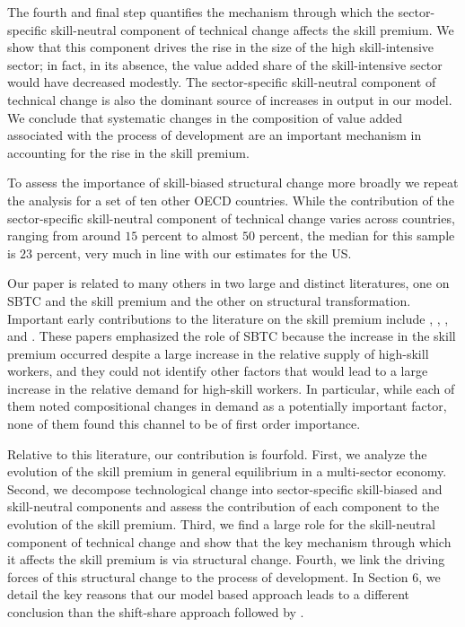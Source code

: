 \documentclass[12pt,english]{article}
\begin{document}
The fourth and final step quantifies the mechanism through which the
sector-specific skill-neutral component of technical change affects the
skill premium. We show that this component drives the rise in the size of
the high skill-intensive sector; in fact, in its absence, the value added
share of the skill-intensive sector would have decreased modestly. The
sector-specific skill-neutral component of technical change is also the
dominant source of increases in output in our model. We conclude that
systematic changes in the composition of value added associated with the
process of development are an important mechanism in accounting for the rise
in the skill premium.

To assess the importance of skill-biased structural change more broadly we
repeat the analysis for a set of ten other OECD countries. While the
contribution of the sector-specific skill-neutral component of technical
change varies across countries, ranging from around $15$ percent to almost $%
50$ percent, the median for this sample is $23$ percent, very much in line
with our estimates for the US.

Our paper is related to many others in two large and distinct literatures,
one on SBTC and the skill premium and the other on structural
transformation. Important early contributions to the literature on the skill
premium include \citet{KatMur92}, \citet{BouJoh92}, \citet{MurWel92}, %
\citet{BBG94} and \citet{BBM98}. These papers emphasized the role of SBTC
because the increase in the skill premium occurred despite a large increase
in the relative supply of high-skill workers, and they could not identify
other factors that would lead to a large increase in the relative demand for
high-skill workers. In particular, while each of them noted compositional
changes in demand as a potentially important factor, none of them found this
channel to be of first order importance.

Relative to this literature, our contribution is fourfold. First, we analyze
the evolution of the skill premium in general equilibrium in a multi-sector
economy. Second, we decompose technological change into sector-specific
skill-biased and skill-neutral components and assess the contribution of
each component to the evolution of the skill premium. Third, we find a large
role for the skill-neutral component of technical change and show that the
key mechanism through which it affects the skill premium is via structural
change. Fourth, we link the driving forces of this structural change to the
process of development. In Section 6, we detail the key reasons that our
model based approach leads to a different conclusion than the shift-share
approach followed by \citet{KatMur92}.
\end{document}
